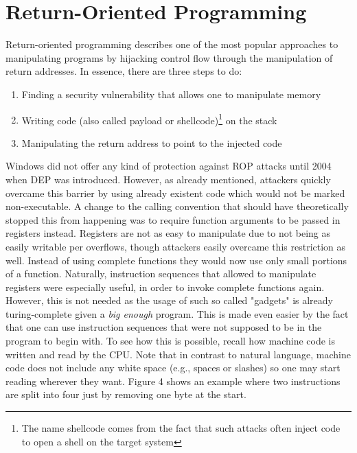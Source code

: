 \documentclass[10pt,twocolumn,a4paper]{article}
\begin{document}
\section{Return-Oriented Programming}\label{ROP}
Return-oriented programming describes one of the most popular approaches to manipulating programs by hijacking control flow through the manipulation of return addresses.
In essence, there are three steps to do:
\begin{enumerate}
	\item Finding a security vulnerability that allows one to manipulate memory
		\item Writing code (also called payload or shellcode)\footnote{The name shellcode comes from the fact that such attacks often inject code to open a shell on the target system} on the stack 
	\item Manipulating the return address to point to the injected code
\end{enumerate}
Windows did not offer any kind of protection against ROP attacks until 2004 when DEP was introduced.
However, as already mentioned, attackers quickly overcame this barrier by using already existent code which would not be marked non-executable\cite{solar}.
A change to the calling convention that should have theoretically stopped this from happening was to require function arguments to be passed in registers instead\cite{calling}. Registers are not as easy to manipulate due to not being as easily writable per overflows, though attackers easily overcame this restriction as well.
Instead of using complete functions they would now use only small portions of a function\cite{krahmer}. Naturally, instruction sequences that allowed to manipulate registers were especially useful, in order to invoke complete functions again.
However, this is not needed as the usage of such so called "gadgets" is already turing-complete given a \emph{big enough}\cite{gadgets} program.
This is made even easier by the fact that one can use instruction sequences that were not supposed to be in the program to begin with.
To see how this is possible, recall how machine code is written and read by the CPU.
Note that in contrast to natural language, machine code does not include any white space (e.g., spaces or slashes) so one may start reading wherever they want.
Figure 4 shows an example where two instructions are split into four just by removing one byte at the start.
\end{document}
